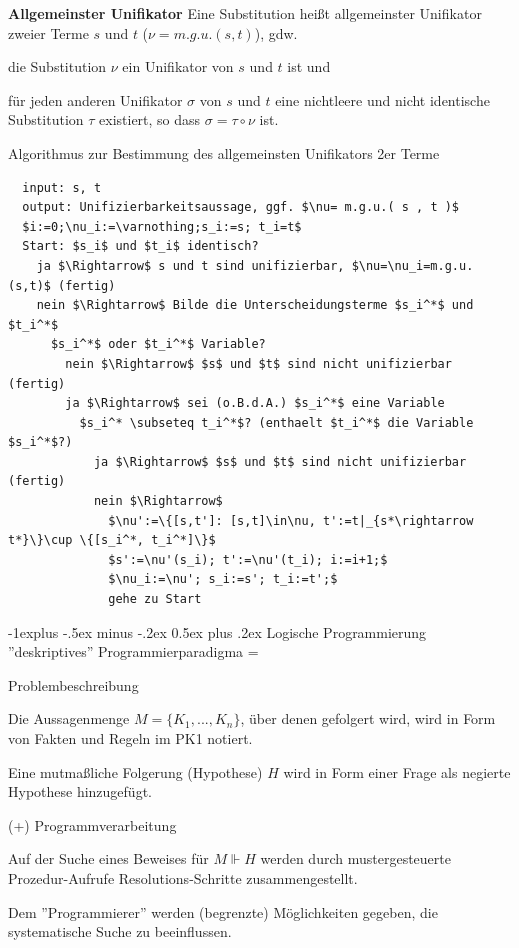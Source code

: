 \documentclass[a4paper]{article}
\makeatletter
\renewcommand{\note}[2]{\begin{noteBox} \textbf{#1} #2 \end{noteBox}}
\renewcommand{\subsection}{\@startsection{subsection}{2}{0mm}%
                {-1explus -.5ex minus -.2ex}%
                {0.5ex plus .2ex}%
                {\normalfont\normalsize\bfseries}}
\makeatother
\begin{document}
\begin{multicols}{3}
  \note{Allgemeinster Unifikator}{Eine Substitution heißt allgemeinster Unifikator zweier Terme $s$ und $t$ ($\nu= m.g.u.(s,t)$), gdw.
    \begin{enumerate*}
      \item die Substitution $\nu$ ein Unifikator von $s$ und $t$ ist und
      \item für jeden anderen Unifikator $\sigma$ von $s$ und $t$ eine nichtleere und nicht identische Substitution $\tau$ existiert, so dass $\sigma=\tau\circ\nu$ ist.
    \end{enumerate*}
  }

  Algorithmus zur Bestimmung des allgemeinsten Unifikators 2er Terme
  \begin{lstlisting}
  input: s, t
  output: Unifizierbarkeitsaussage, ggf. $\nu= m.g.u.( s , t )$
  $i:=0;\nu_i:=\varnothing;s_i:=s; t_i=t$
  Start: $s_i$ und $t_i$ identisch?
    ja $\Rightarrow$ s und t sind unifizierbar, $\nu=\nu_i=m.g.u.(s,t)$ (fertig)
    nein $\Rightarrow$ Bilde die Unterscheidungsterme $s_i^*$ und $t_i^*$
      $s_i^*$ oder $t_i^*$ Variable?
        nein $\Rightarrow$ $s$ und $t$ sind nicht unifizierbar (fertig)
        ja $\Rightarrow$ sei (o.B.d.A.) $s_i^*$ eine Variable
          $s_i^* \subseteq t_i^*$? (enthaelt $t_i^*$ die Variable $s_i^*$?)
            ja $\Rightarrow$ $s$ und $t$ sind nicht unifizierbar (fertig)
            nein $\Rightarrow$ 
              $\nu':=\{[s,t']: [s,t]\in\nu, t':=t|_{s*\rightarrow t*}\}\cup \{[s_i^*, t_i^*]\}$
              $s':=\nu'(s_i); t':=\nu'(t_i); i:=i+1;$
              $\nu_i:=\nu'; s_i:=s'; t_i:=t';$ 
              gehe zu Start
  \end{lstlisting}

  \subsection{Logische Programmierung}
  ''deskriptives'' Programmierparadigma =
  \begin{enumerate*}
    \item Problembeschreibung
    \begin{itemize*}
      \item Die Aussagenmenge $M =\{K_1,...,K_n\}$, über denen gefolgert wird, wird in Form von Fakten und Regeln im PK1 notiert.
      \item Eine mutmaßliche Folgerung (Hypothese) $H$ wird in Form einer Frage als negierte Hypothese hinzugefügt.
    \end{itemize*}
    \item (+) Programmverarbeitung
    \begin{itemize*}
      \item Auf der Suche eines Beweises für $M \Vdash H$ werden durch mustergesteuerte Prozedur-Aufrufe Resolutions-Schritte zusammengestellt.
      \item Dem ''Programmierer'' werden (begrenzte) Möglichkeiten gegeben, die systematische Suche zu beeinflussen.
    \end{itemize*}
  \end{enumerate*}


\end{multicols}
\end{document}
